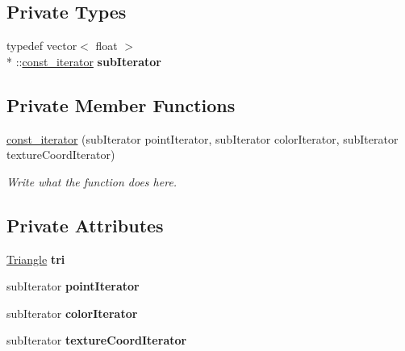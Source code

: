 \subsection*{Private Types}
\begin{DoxyCompactItemize}
\item 
\hypertarget{classconst__iterator_a8e9d9b2f914a334cddc233d0c4e708e6}{typedef vector$<$ float $>$\\*
\+::\hyperlink{classconst__iterator}{const\+\_\+iterator} {\bfseries sub\+Iterator}}\label{classconst__iterator_a8e9d9b2f914a334cddc233d0c4e708e6}

\end{DoxyCompactItemize}
\subsection*{Private Member Functions}
\begin{DoxyCompactItemize}
\item 
\hyperlink{classconst__iterator_a58dc10154f550486abb08f23ecdbade4}{const\+\_\+iterator} (sub\+Iterator point\+Iterator, sub\+Iterator color\+Iterator, sub\+Iterator texture\+Coord\+Iterator)
\begin{DoxyCompactList}\small\item\em Write what the function does here. \end{DoxyCompactList}\end{DoxyCompactItemize}
\subsection*{Private Attributes}
\begin{DoxyCompactItemize}
\item 
\hypertarget{classconst__iterator_a630069d171a1de9e5b3d98044f9697c7}{\hyperlink{structTriangle}{Triangle} {\bfseries tri}}\label{classconst__iterator_a630069d171a1de9e5b3d98044f9697c7}

\item 
\hypertarget{classconst__iterator_a56b320495e19758b462504553990c3c4}{sub\+Iterator {\bfseries point\+Iterator}}\label{classconst__iterator_a56b320495e19758b462504553990c3c4}

\item 
\hypertarget{classconst__iterator_ab2f451f744334404bd4fe8d79a1a6a90}{sub\+Iterator {\bfseries color\+Iterator}}\label{classconst__iterator_ab2f451f744334404bd4fe8d79a1a6a90}

\item 
\hypertarget{classconst__iterator_a1666b8cc74a956f658675c3e73e71c6f}{sub\+Iterator {\bfseries texture\+Coord\+Iterator}}\label{classconst__iterator_a1666b8cc74a956f658675c3e73e71c6f}

\end{DoxyCompactItemize}
